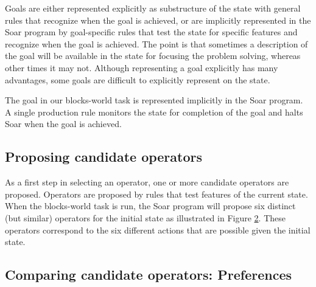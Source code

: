 \begin{figure}
\label{fig:ab-wmem2}
\end{figure}

Goals are either represented explicitly as substructure of the state
with general rules that recognize when the goal is achieved, or are
implicitly represented in the Soar program by goal-specific rules that
test the state for specific features and recognize when the goal is
achieved.  The point is that sometimes a description of the goal will be
available in the state for focusing the problem solving, whereas other
times it may not.  Although representing a goal explicitly has many advantages,
some goals are difficult to explicitly represent on the state.

The goal in our blocks-world task is represented implicitly in the Soar
program. A single production rule monitors the state for completion of the goal and
halts Soar when the goal is achieved.

\subsection{Proposing candidate operators}

As a first step in selecting an operator, one or more candidate
operators are proposed.  Operators are proposed by rules that test
features of the current state.  When the blocks-world task is run, the
Soar program will propose six distinct (but similar) operators for the
initial state as illustrated in Figure \ref{fig:proposal}. These
operators correspond to the six different actions that are possible
given the initial state.

\begin{figure}
\label{fig:proposal}
\end{figure}


\subsection{Comparing candidate operators: Preferences}

